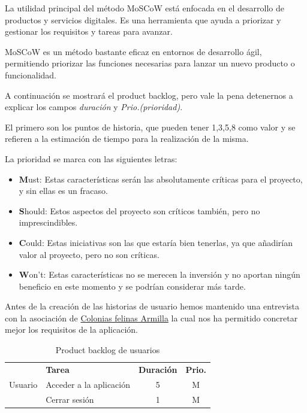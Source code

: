 La utilidad principal del método MoSCoW está enfocada en el desarrollo de productos y servicios digitales. Es una herramienta que ayuda a priorizar y gestionar los requisitos y tareas para avanzar.

MoSCoW es un método bastante eficaz en entornos de desarrollo ágil, permitiendo priorizar las funciones necesarias para lanzar un nuevo producto o funcionalidad.

A continuación se mostrará el product backlog, pero vale la pena detenernos a explicar los campos \textit{duración} y \textit{Prio.(prioridad)}.

El primero son los puntos de historia, que pueden tener 1,3,5,8 como valor y se refieren a la estimación de tiempo para la realización de la misma.

La prioridad se marca con las siguientes letras:
\begin{itemize}
	\item  \textbf{M}ust: Estas características serán las absolutamente críticas para el proyecto, y sin ellas es un fracaso.
	\item \textbf{S}hould: Estos aspectos del proyecto son críticos también, pero no imprescindibles.
	\item \textbf{C}ould: Estas iniciativas son las que estaría bien tenerlas, ya que añadirían valor al proyecto, pero no son críticas.
	\item \textbf{W}on't: Estas características no se merecen la inversión y no aportan ningún beneficio en este momento y se podrían considerar más tarde.
\end{itemize}

Antes de la creación de las historias de usuario hemos mantenido una entrevista con la asociación de \href{https://www.instagram.com/coloniasfelinasarmilla/}{Colonias felinas Armilla} la cual nos ha permitido concretar mejor los requisitos de la aplicación.

\begin{table}[H]
	\centering
	\begin{tabular}{|c |p{8cm}|c |c|} \hline 
		\multirow[c]{3}{*}{Usuario}&  \textbf{Tarea}&  \textbf{Duración}& \textbf{Prio.}\\  \cline{2-4}%
		&  Acceder a la aplicación&  5& M\\ \cline{2-4} 
		&  Cerrar sesión&  1& M\\ \hline 
	\end{tabular}
	\caption{Product backlog de usuarios}
	\label{tab:pb_usuarios}
\end{table}

